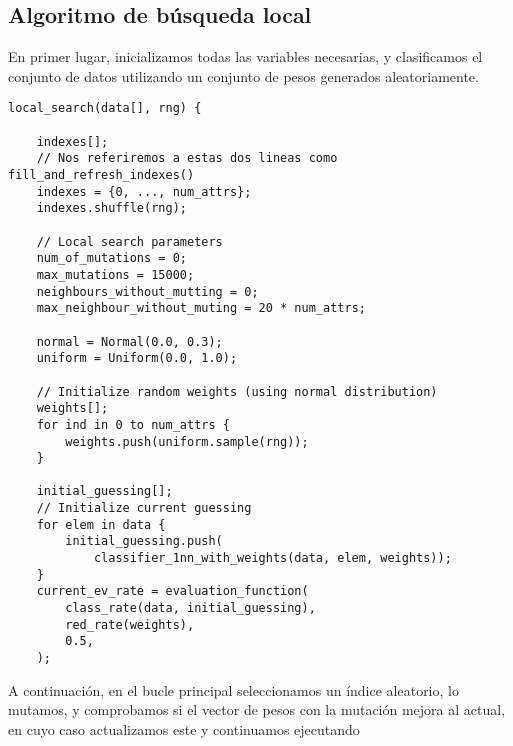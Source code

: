 \documentclass[size=a4, parskip=half, titlepage=false, toc=flat, toc=bib, 12pt]{scrartcl}
\begin{document}
\subsection{Algoritmo de búsqueda local}
En primer lugar, inicializamos todas las variables necesarias, y clasificamos el conjunto de datos utilizando un conjunto de pesos generados aleatoriamente.
\begin{verbatim}
local_search(data[], rng) {

    indexes[];
    // Nos referiremos a estas dos lineas como fill_and_refresh_indexes()
    indexes = {0, ..., num_attrs};
    indexes.shuffle(rng);

    // Local search parameters
    num_of_mutations = 0;
    max_mutations = 15000;
    neighbours_without_mutting = 0;
    max_neighbour_without_muting = 20 * num_attrs;

    normal = Normal(0.0, 0.3);
    uniform = Uniform(0.0, 1.0);

    // Initialize random weights (using normal distribution)
    weights[];
    for ind in 0 to num_attrs {
        weights.push(uniform.sample(rng));
    }

    initial_guessing[];
    // Initialize current guessing
    for elem in data {
        initial_guessing.push(
            classifier_1nn_with_weights(data, elem, weights));
    }
    current_ev_rate = evaluation_function(
        class_rate(data, initial_guessing),
        red_rate(weights),
        0.5,
    );
\end{verbatim}

A continuación, en el bucle principal seleccionamos un índice aleatorio, lo mutamos, y comprobamos si el vector de pesos con la mutación mejora al actual, en cuyo caso actualizamos este y continuamos ejecutando
\end{document}
